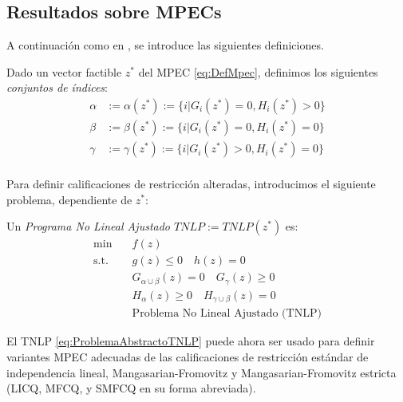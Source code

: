 \subsection{Resultados sobre MPECs}

A continuación como en \cite{Flegel2003AFJ}, se introduce las siguientes definiciones.
\begin{definition}
Dado un vector factible $z^*$ del MPEC \eqref{eq:DefMpec}, definimos los siguientes \textit{conjuntos de índices}:
\begin{equation}
\begin{aligned}
\alpha &:= \alpha(z^*) := \{i|G_i(z^*) = 0, H_i(z^*) > 0\} \\
\beta &:= \beta(z^*) := \{i|G_i(z^*) = 0, H_i(z^*) = 0\}  \\
\gamma &:= \gamma(z^*) := \{i|G_i(z^*) > 0, H_i(z^*) = 0\}  \\
\end{aligned}
\label{eq:ConjuntoDeIndices} 
\end{equation}
\end{definition}

Para definir calificaciones de restricción alteradas, introducimos el siguiente problema, dependiente de $z^*$:

\begin{definition}

Un \textit{Programa No Lineal Ajustado $TNLP := TNLP(z^*)$} es:
\begin{equation}
\begin{aligned} 
\min \quad & f(z) \\
\text{s.t.} \quad & g(z) \leq 0 \quad h(z) = 0  \\
& G_{\alpha \cup \beta}(z) = 0 \quad G_{\gamma}(z) \geq 0  \\
& H_{\alpha}(z) \geq 0 \quad H_{\gamma \cup \beta}(z) = 0  \\
& \text{Problema No Lineal Ajustado (TNLP)}  
\end{aligned}
\label{eq:ProblemaAbstractoTNLP}
\end{equation}
    
\end{definition}

El TNLP \eqref{eq:ProblemaAbstractoTNLP} puede ahora ser usado para definir variantes MPEC adecuadas de las calificaciones de restricción estándar de independencia lineal, Mangasarian-Fromovitz y Mangasarian-Fromovitz estricta (LICQ, MFCQ, y SMFCQ en su forma abreviada).

